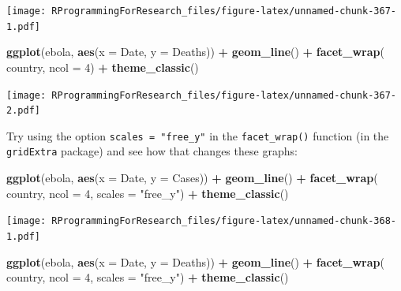 \documentclass[]{book}
\makeatletter
\newenvironment{Shaded}{\begin{snugshade}}{\end{snugshade}}
\newcommand{\KeywordTok}[1]{\textcolor[rgb]{0.13,0.29,0.53}{\textbf{#1}}}
\newcommand{\DataTypeTok}[1]{\textcolor[rgb]{0.13,0.29,0.53}{#1}}
\newcommand{\DecValTok}[1]{\textcolor[rgb]{0.00,0.00,0.81}{#1}}
\newcommand{\StringTok}[1]{\textcolor[rgb]{0.31,0.60,0.02}{#1}}
\newcommand{\OperatorTok}[1]{\textcolor[rgb]{0.81,0.36,0.00}{\textbf{#1}}}
\newcommand{\NormalTok}[1]{#1}
\newenvironment{kframe}{%
\medskip{}
\setlength{\fboxsep}{.8em}
 \def\at@end@of@kframe{}%
 \ifinner\ifhmode%
  \def\at@end@of@kframe{\end{minipage}}%
  \begin{minipage}{\columnwidth}%
 \fi\fi%
 \def\FrameCommand##1{\hskip\@totalleftmargin \hskip-\fboxsep
 \colorbox{shadecolor}{##1}\hskip-\fboxsep
     \hskip-\linewidth \hskip-\@totalleftmargin \hskip\columnwidth}%
 \MakeFramed {\advance\hsize-\width
   \@totalleftmargin\z@ \linewidth\hsize
   \@setminipage}}%
 {\par\unskip\endMakeFramed%
 \at@end@of@kframe}
\renewenvironment{Shaded}{\begin{kframe}}{\end{kframe}}
\theoremstyle{definition}
\theoremstyle{definition}
\theoremstyle{definition}
\theoremstyle{remark}
\makeatother
\begin{document}
\texttt{[image: RProgrammingForResearch\_files/figure-latex/unnamed-chunk-367-1.pdf]}

\begin{Shaded}
\begin{Highlighting}[]
\KeywordTok{ggplot}\NormalTok{(ebola, }\KeywordTok{aes}\NormalTok{(}\DataTypeTok{x =}\NormalTok{ Date, }\DataTypeTok{y =}\NormalTok{ Deaths)) }\OperatorTok{+}\StringTok{ }
\StringTok{        }\KeywordTok{geom_line}\NormalTok{() }\OperatorTok{+}\StringTok{ }
\StringTok{        }\KeywordTok{facet_wrap}\NormalTok{(}\OperatorTok{~}\StringTok{ }\NormalTok{country, }\DataTypeTok{ncol =} \DecValTok{4}\NormalTok{) }\OperatorTok{+}\StringTok{ }
\StringTok{        }\KeywordTok{theme_classic}\NormalTok{()}
\end{Highlighting}
\end{Shaded}

\texttt{[image: RProgrammingForResearch\_files/figure-latex/unnamed-chunk-367-2.pdf]}

Try using the option \texttt{scales\ =\ "free\_y"} in the
\texttt{facet\_wrap()} function (in the \texttt{gridExtra} package) and
see how that changes these graphs:

\begin{Shaded}
\begin{Highlighting}[]
\KeywordTok{ggplot}\NormalTok{(ebola, }\KeywordTok{aes}\NormalTok{(}\DataTypeTok{x =}\NormalTok{ Date, }\DataTypeTok{y =}\NormalTok{ Cases)) }\OperatorTok{+}\StringTok{ }
\StringTok{        }\KeywordTok{geom_line}\NormalTok{() }\OperatorTok{+}\StringTok{ }
\StringTok{        }\KeywordTok{facet_wrap}\NormalTok{(}\OperatorTok{~}\StringTok{ }\NormalTok{country, }\DataTypeTok{ncol =} \DecValTok{4}\NormalTok{, }\DataTypeTok{scales =} \StringTok{"free_y"}\NormalTok{) }\OperatorTok{+}\StringTok{ }
\StringTok{        }\KeywordTok{theme_classic}\NormalTok{()}
\end{Highlighting}
\end{Shaded}

\texttt{[image: RProgrammingForResearch\_files/figure-latex/unnamed-chunk-368-1.pdf]}

\begin{Shaded}
\begin{Highlighting}[]
\KeywordTok{ggplot}\NormalTok{(ebola, }\KeywordTok{aes}\NormalTok{(}\DataTypeTok{x =}\NormalTok{ Date, }\DataTypeTok{y =}\NormalTok{ Deaths)) }\OperatorTok{+}\StringTok{ }
\StringTok{        }\KeywordTok{geom_line}\NormalTok{() }\OperatorTok{+}\StringTok{ }
\StringTok{        }\KeywordTok{facet_wrap}\NormalTok{(}\OperatorTok{~}\StringTok{ }\NormalTok{country, }\DataTypeTok{ncol =} \DecValTok{4}\NormalTok{, }\DataTypeTok{scales =} \StringTok{"free_y"}\NormalTok{) }\OperatorTok{+}\StringTok{ }
\StringTok{        }\KeywordTok{theme_classic}\NormalTok{()}
\end{Highlighting}
\end{Shaded}
\end{document}
